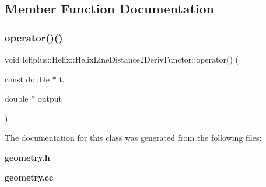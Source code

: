 \subsection{Member Function Documentation}
\mbox{\label{classlcfiplus_1_1Helix_1_1HelixLineDistance2DerivFunctor_a353ad23f6ce49a4bf2c3660863b9375e}} 
\subsubsection{operator()()}
{\footnotesize\ttfamily void lcfiplus\+::\+Helix\+::\+Helix\+Line\+Distance2\+Deriv\+Functor\+::operator() (\begin{DoxyParamCaption}\item[{const double $\ast$}]{t,  }\item[{double $\ast$}]{output }\end{DoxyParamCaption})}



The documentation for this class was generated from the following files\+:\begin{DoxyCompactItemize}
\item 
\textbf{ geometry.\+h}\item 
\textbf{ geometry.\+cc}\end{DoxyCompactItemize}
